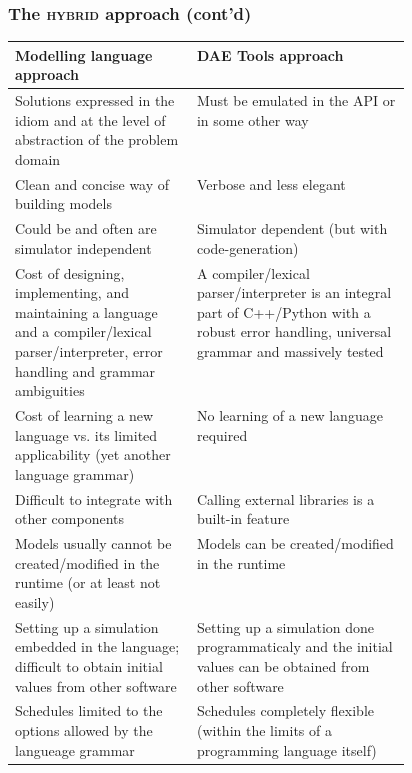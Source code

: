 \documentclass[compress,newPxFont,sthlmFooter]{beamer}
\begin{document}
\begin{frame}[plain]
\frametitle{The \textsc{hybrid} approach (cont'd)}
\tiny
{
\begin{table}
  \begin{tabularx}{\linewidth}{p{0.46\linewidth}X}
    \toprule
    \textcolor{sthlmRed}{\textbf{Modelling language approach}} & \textcolor{sthlmRed}{\textbf{DAE Tools approach}} \tabularnewline
    \midrule
    
    \cellcolor{light_green}Solutions expressed in the idiom and at the level of abstraction of the problem domain
      &
    \cellcolor{light_red}Must be emulated in the API or in some other way 
    \tabularnewline \midrule
    
    \cellcolor{light_green}Clean and concise way of building models
      &
    \cellcolor{light_red}Verbose and less elegant
    \tabularnewline \midrule
    
    \cellcolor{light_green}Could be and often are simulator independent
      &
    \cellcolor{light_red}Simulator dependent (but with code-generation) 
    \tabularnewline \midrule
    
    \cellcolor{light_red}Cost of designing, implementing, and maintaining a language and 
    a compiler/lexical parser/interpreter, error handling and grammar ambiguities
      &
    \cellcolor{light_green}A compiler/lexical parser/interpreter is an integral part of C++/Python with a
    robust error handling, universal grammar and massively tested 
    \tabularnewline \midrule
    
    \cellcolor{light_red}Cost of learning a new language vs. its limited applicability (yet another language grammar)
      &
    \cellcolor{light_green}No learning of a new language required
    \tabularnewline \midrule
    
    \cellcolor{light_red}Difficult to integrate with other components
      &
    \cellcolor{light_green}Calling external libraries is a built-in feature 
    \tabularnewline \midrule
    
    \cellcolor{light_red}Models usually cannot be created/modified in the runtime (or at least not easily)
      &
    \cellcolor{light_green}Models can be created/modified in the runtime 
    \tabularnewline \midrule
    
    \cellcolor{light_red}Setting up a simulation embedded in the language; difficult to obtain initial values from other software
      &
    \cellcolor{light_green}Setting up a simulation done programmaticaly and the initial values can be obtained from other software
    \tabularnewline \midrule
    
    \cellcolor{light_red}Schedules limited to the options allowed by the langueage grammar
      &
    \cellcolor{light_green}Schedules completely flexible (within the limits of a programming language itself)
    \tabularnewline
    
    \bottomrule
  \end{tabularx}
\end{table}
}
\end{frame}
\end{document}
